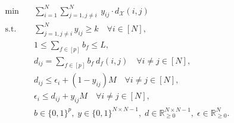 \documentclass[10pt,a4paper]{amsart}
\newcommand{\X}{{\mathcal{X}}} %
\newcommand{\instanceindex}{i}
\newcommand{\instanceindextwo}{j}
\newcommand{\instfeatures}{[p]} %
\newcommand{\soldist}[1][(\instanceindex,\instanceindextwo)]{d_\X#1} %
\begin{document}
	\begin{align}
		\label{problem:optimistic_fspeo:obj}\min \quad &\sum_{i=1}^N \sum_{j=1,j\neq i}^N\ y_{ij}\cdot \soldist\\
		\label{problem:optimistic_fspeo:k_neighbors}\text{s.t.} \quad &\sum_{j=1, j\neq i}^N y_{ij} \ge k\quad \forall i\in [N],\\
		\label{problem:optimistic_fspeo:L_features}&1 \le \sum_{f\in\instfeatures} b_f\le L,\\
		\label{problem:optimistic_fspeo:instance_diff}&d_{ij} = \sum_{f\in\instfeatures} b_f\ d_f(i,j) \quad \forall i\neq j\in [N],\\
		\label{problem:optimistic_fspeo:neighboring1}&d_{ij} \le\epsilon_i+(1-y_{ij})M\quad \forall i\neq j\in [N],\\
		\label{problem:optimistic_fspeo:neighboring2}&\epsilon_i\le d_{ij} + y_{ij}M\quad \forall i\neq j\in [N],\\
		\label{problem:optimistic_fspeo:vardef}&b\in\{0,1\}^{p},\; y\in\{0,1\}^{N\times N-1},\; d \in \mathbb{R}^{N\times N-1}_{\geq 0},\;
	    \epsilon\in\mathbb{R}_{\ge 0}^N.
	\end{align}
\end{document}

